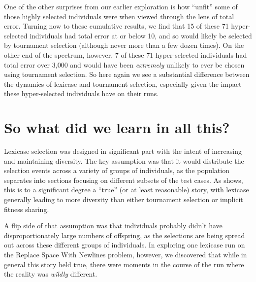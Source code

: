 One of the other surprises from our earlier exploration is how ``unfit'' some of those highly selected individuals were when
viewed through the lens of total error. Turning now to these cumulative results, we find that 15 of these 71 hyper-selected
individuals had total error at or below 10, and so would likely be selected by tournament selection (although never more 
than a few dozen times). On the other end of the spectrum, however, 7 of these 71 hyper-selected individuals had total 
error over 3,000 and would have been \emph{extremely} unlikely to ever be chosen using tournament selection. So here
again we see a substantial difference between the dynamics of lexicase and tournament selection, especially given the
impact these hyper-selected individuals have on their runs.

\section{So what did we learn in all this?}
\label{sec:whatDidWeLearn}




Lexicase selection \citep{Helmuth:2015:ieeeTEC} was designed in significant part with the intent of 
increasing and maintaining diversity. The key assumption was that it would distribute the selection 
events across a variety of groups of individuals, as the population separates into sections focusing
on different subsets of the test cases. As \citep{helmuth:GPTP15} shows, this is to a significant
degree a ``true'' (or at least reasonable) story, with lexicase generally leading to more diversity
than either tournament selection or implicit fitness sharing.

A flip side of that assumption was that individuals probably didn't have disproportionately 
large numbers of offspring, as the selections are being spread out across these different groups
of individuals. In exploring one lexicase run on the Replace Space With Newlines problem, however,
we discovered that while in general this story held true, there were moments in the course of the run
where the reality was \emph{wildly} different.

